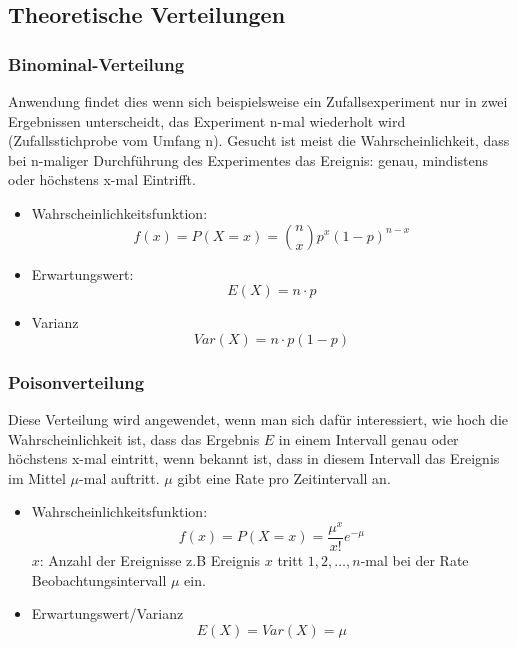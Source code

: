 \subsection{Theoretische Verteilungen}
\subsubsection{Binominal-Verteilung}
Anwendung findet dies wenn sich beispielsweise ein Zufallsexperiment nur in zwei Ergebnissen unterscheidt, das Experiment n-mal wiederholt wird (Zufallsstichprobe vom Umfang n). Gesucht ist meist die Wahrscheinlichkeit, dass bei n-maliger Durchführung des Experimentes das Ereignis: genau, mindistens oder höchstens x-mal Eintrifft.
\begin{itemize}
	\item Wahrscheinlichkeitsfunktion: 
	\begin{equation}
	f(x)=P(X=x)={n \choose x}p^{x}(1-p)^{n-x}
	\end{equation}
	\item Erwartungswert: 
	\begin{equation}
	E(X) = n\cdot p
	\end{equation}
	\item Varianz
	\begin{equation}
	Var(X) = n\cdot p(1-p)
	\end{equation}
\end{itemize}
\subsubsection{Poisonverteilung}
Diese Verteilung wird angewendet, wenn man sich dafür interessiert, wie hoch die Wahrscheinlichkeit ist, dass das Ergebnis $E$ in einem Intervall genau oder höchstens x-mal eintritt, wenn bekannt ist, dass in diesem Intervall das Ereignis im Mittel $\mu$-mal auftritt. $\mu$ gibt eine Rate pro Zeitintervall an.
\begin{itemize}
	\item Wahrscheinlichkeitsfunktion:
	\begin{equation}
	f(x) = P(X=x) = \frac{\mu^{x}}{x!} e^{-\mu}
	\end{equation}
	$x$: Anzahl der Ereignisse z.B Ereignis $x$ tritt $1, 2, \ldots, n$-mal bei der Rate Beobachtungsintervall $\mu$ ein. 
	\item Erwartungswert/Varianz
	\begin{equation}
	E(X) = Var(X)=\mu
	\end{equation}
\end{itemize}
